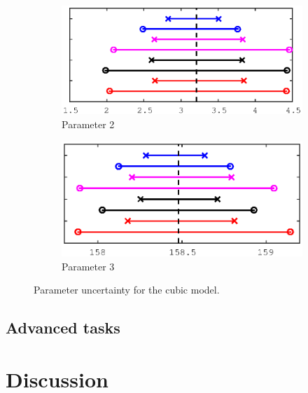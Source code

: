 \documentclass[11pt,a4paper,oneside]{report}
\begin{document}
\begin{figure}
  \begin{subfigure}[b]{0.5\textwidth}
    \includegraphics[width=\textwidth, trim=0 0 0 0,clip=true]{figures/task5/uncert_model3_param3.eps}
    \caption{Parameter 2}
  \end{subfigure}%
  \begin{subfigure}[b]{0.5\textwidth}
    \includegraphics[width=\textwidth, trim=0 0 0 0,clip=true]{figures/task5/uncert_model3_param4.eps}
    \caption{Parameter 3}
  \end{subfigure}%
  
  \caption{Parameter uncertainty for the cubic model.}
  \label{fig:c5uncertM1}
  
\end{figure}

\subsection*{Advanced tasks}

\section*{Discussion}



\end{document}
